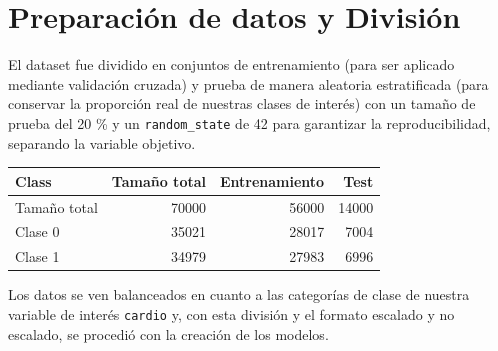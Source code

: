 \documentclass[
  10pt,
]{article}
\newcounter{none} %
\begin{document}
\begin{table}[!h]
\centering
\caption{\label{tab:tabla_data_set}Data set con todas las variables presente en el mismo}
\centering
{}
\end{table}

\section{Preparación de datos y
División}\label{preparaciuxf3n-de-datos-y-divisiuxf3n}

El dataset fue dividido en conjuntos de entrenamiento (para ser aplicado
mediante validación cruzada) y prueba de manera aleatoria estratificada
(para conservar la proporción real de nuestras clases de interés) con un
tamaño de prueba del 20 \% y un \texttt{random\_state} de 42 para
garantizar la reproducibilidad, separando la variable objetivo.

{\def\LTcaptype{none} %
\begin{longtable}[]{@{}lrrr@{}}
\toprule\noalign{}
Class & Tamaño total & Entrenamiento & Test \\
\midrule\noalign{}
\endhead
\bottomrule\noalign{}
\endlastfoot
Tamaño total & 70000 & 56000 & 14000 \\
Clase 0 & 35021 & 28017 & 7004 \\
Clase 1 & 34979 & 27983 & 6996 \\
\end{longtable}
}

Los datos se ven balanceados en cuanto a las categorías de clase de
nuestra variable de interés \texttt{cardio} y, con esta división y el
formato escalado y no escalado, se procedió con la creación de los
modelos.
\end{document}
